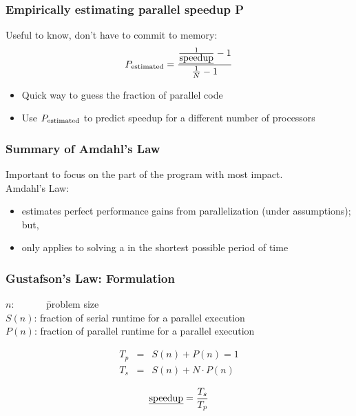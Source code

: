 \begin{frame}
  \frametitle{Empirically estimating parallel speedup P}

  \hspace*{2em} Useful to know, don't have to commit to memory:
  \vfill
  \[P_{\mbox{\scriptsize estimated}} = \frac{\frac{1}{\mbox{\em speedup}}-1}{\frac{1}{N}-1}\]
  \vfill
  \hspace*{2em} \begin{minipage}{.8\textwidth} \begin{itemize}
    \item Quick way to guess the fraction of parallel code
    \item Use $P_{\mbox{\scriptsize estimated}}$ to predict speedup for a different number of processors
  \end{itemize} \end{minipage}
\end{frame}

\begin{frame}
  \frametitle{Summary of Amdahl's Law}

\hspace*{2em} Important to focus on the part of the program with most impact.\\[1em]

\hspace*{2em} Amdahl's Law:\\[1em]
\hspace*{2em}
  \begin{itemize}
    \item estimates perfect performance gains from
          parallelization (under assumptions); but,
    \vfill
    \item only applies to solving a  in the
          shortest possible period of time
  \end{itemize}
\end{frame}

\begin{frame}
  \frametitle{Gustafson's Law: Formulation}

\hspace*{2em} 
\begin{tabbing}
  $n$:~~~~~~ \= problem size\\[.1em]

  $S(n)$: \> fraction of serial runtime for a parallel execution\\[.1em]

  $P(n)$: \> fraction of parallel runtime for a parallel execution\\
\end{tabbing}


\begin{eqnarray*}
T_p &=& S(n) + P(n) = 1 \\
T_s &=& S(n) + N \cdot P(n) 
\end{eqnarray*}

\[ \mbox{\em speedup} = \frac{T_s}{T_p} \]
\end{frame}

